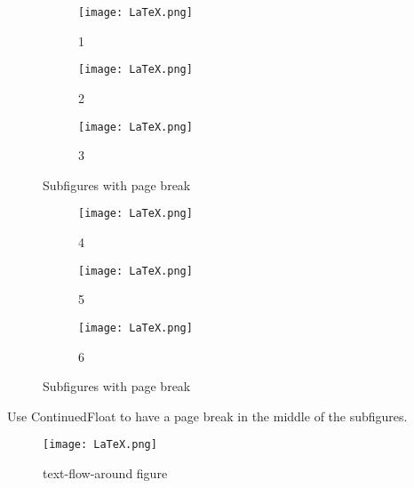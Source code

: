 \documentclass{article}
\begin{document}
\begin{figure}[hb!]
  \centering
  \begin{subfigure}[b]{\linewidth}
    \texttt{[image: LaTeX.png]}
    \caption{1}
  \end{subfigure}
  \begin{subfigure}[b]{\linewidth}
    \texttt{[image: LaTeX.png]}
    \caption{2}
  \end{subfigure}
  \begin{subfigure}[b]{\linewidth}
    \texttt{[image: LaTeX.png]}
    \caption{3}
  \end{subfigure}
  \caption{Subfigures with page break}
  \label{fig:LaTeX5}
\end{figure}
\begin{figure}[h!]
  \ContinuedFloat
  \centering
  \begin{subfigure}[b]{\linewidth}
    \texttt{[image: LaTeX.png]}
    \caption{4}
  \end{subfigure}
  \begin{subfigure}[b]{\linewidth}
    \texttt{[image: LaTeX.png]}
    \caption{5}
  \end{subfigure}
  \begin{subfigure}[b]{\linewidth}
    \texttt{[image: LaTeX.png]}
    \caption{6}
  \end{subfigure}
  \caption{Subfigures with page break}
  \label{fig:LaTeX5}
\end{figure}
Use ContinuedFloat to have a page break in the middle of the subfigures.

\newpage

\blindtext

\begin{wrapfigure}{i}{0pt}
    \texttt{[image: LaTeX.png]}
    \caption{text-flow-around figure}
\end{wrapfigure}
\blindtext
\end{document}
